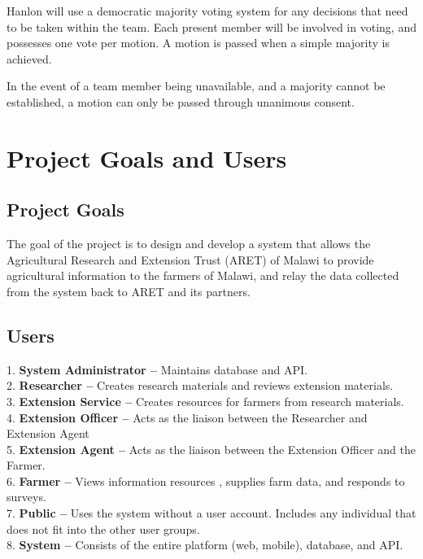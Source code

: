 \documentclass[12pt,letterpaper]{article}
\begin{document}
Hanlon will use a democratic majority voting system for any decisions that need to be taken within the team. Each present member will be involved in voting, and possesses one vote per motion. A motion is passed when a simple majority is achieved. \par

In the event of a team member being unavailable, and a majority cannot be established, a motion can only be passed through unanimous consent.

\clearpage
\section{Project Goals and Users}
\subsection{Project Goals}

The goal of the project is to design and develop a system that allows the Agricultural Research and Extension Trust (ARET) of Malawi to provide agricultural information to the farmers of Malawi, and relay the data collected from the system back to ARET and its partners.

\subsection{Users}
1.\hspace*{5pt} \textbf{System Administrator -- } Maintains database and API.\\
2.\hspace*{5pt} \textbf{Researcher -- } Creates research materials and reviews extension materials. \\
3.\hspace*{5pt} \textbf{Extension Service --} Creates resources for farmers from research materials. \\
4.\hspace*{5pt} \textbf{Extension Officer -- } Acts as the liaison between the Researcher and Extension Agent \\
5.\hspace*{5pt} \textbf{Extension Agent -- } Acts as the liaison between the Extension Officer and the Farmer. \\
6.\hspace*{5pt} \textbf{Farmer -- } Views information resources , supplies farm data, and responds to surveys. \\
7.\hspace*{5pt} \textbf{Public -- } Uses the system without a user account. Includes any individual that does not fit into the other user groups. \\
8.\hspace*{5pt} \textbf{System -- } Consists of the entire platform (web, mobile), database, and API.
\end{document}
